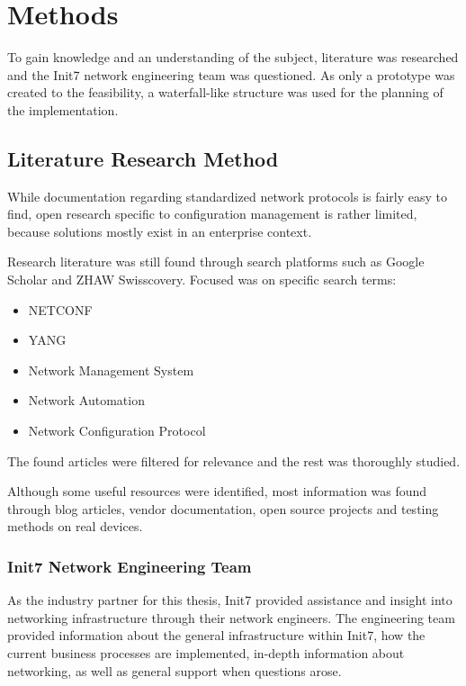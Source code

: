 \chapter{\label{methods}Methods}
\thispagestyle{fancy}


To gain knowledge and an understanding of the subject, literature was researched and
the Init7 network engineering team was questioned. As only a
prototype was created to the feasibility, a waterfall-like structure was used for
the planning of the implementation.

\section{Literature Research Method}

While documentation regarding standardized network protocols is fairly easy to find,
open research specific to configuration management is rather limited, because solutions
mostly exist in an enterprise context.

Research literature was still found through search platforms such as Google Scholar and
ZHAW Swisscovery. Focused was on specific search terms:

\begin{itemize}
  \item NETCONF
  \item YANG
  \item Network Management System
  \item Network Automation
  \item Network Configuration Protocol
\end{itemize}

The found articles were filtered for relevance and the rest was thoroughly studied.

Although some useful resources were identified, most information was found through
blog articles, vendor documentation, open source projects and testing methods on real
devices.

\subsection{Init7 Network Engineering Team}

As the industry partner for this thesis, Init7 provided assistance and insight into
networking infrastructure through their network engineers.
The engineering team provided information about the general infrastructure within Init7, 
how the current business processes are implemented, in-depth information about
networking, as well as general support when questions arose.


